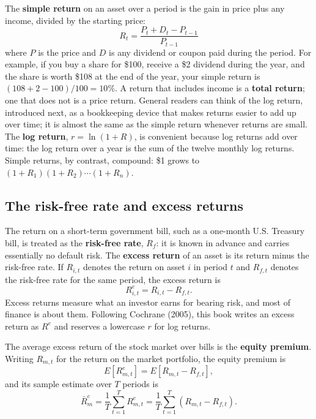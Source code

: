 The \textbf{simple return} on an asset over a period is the gain in price plus any income, divided by the starting price:
\begin{equation}
  R_t = \frac{P_t + D_t - P_{t-1}}{P_{t-1}}
  \label{eq:01-return}
\end{equation}
where $P$ is the price and $D$ is any dividend or coupon paid during the period. For example, if you buy a share for \$100, receive a \$2 dividend during the year, and the share is worth \$108 at the end of the year, your simple return is $(108 + 2 - 100)/100 = 10$\%. A return that includes income is a \textbf{total return}; one that does not is a price return. General readers can think of the log return, introduced next, as a bookkeeping device that makes returns easier to add up over time; it is almost the same as the simple return whenever returns are small. The \textbf{log return}, $r = \ln(1 + R)$, is convenient because log returns add over time: the log return over a year is the sum of the twelve monthly log returns. Simple returns, by contrast, compound: \$1 grows to $(1 + R_1)(1 + R_2)\cdots(1 + R_n)$.

\subsection{The risk-free rate and excess returns}
\label{sec:01-rf}

The return on a short-term government bill, such as a one-month U.S. Treasury bill, is treated as the \textbf{risk-free rate}, $R_f$: it is known in advance and carries essentially no default risk. 
The \textbf{excess return} of an asset is its return minus the risk-free rate. If $R_{i,t}$ denotes the return on asset $i$ in period $t$ and $R_{f,t}$ denotes the risk-free rate for the same period, the excess return is
\begin{equation}
R^{e}_{i,t} = R_{i,t} - R_{f,t}.
\label{eq:excess-return}
\end{equation}
Excess returns measure what an investor earns for bearing risk, and most of finance is about them. Following Cochrane (2005), this book writes an excess return as $R^{e}$ and reserves a lowercase $r$ for log returns.

The average excess return of the stock market over bills is the \textbf{equity premium}. Writing $R_{m,t}$ for the return on the market portfolio, the equity premium is
\begin{equation}
E\left[R^{e}_{m,t}\right] = E\left[R_{m,t} - R_{f,t}\right],
\label{eq:equity-premium}
\end{equation}
and its sample estimate over $T$ periods is
\begin{equation}
\bar{R}^{e}_{m} = \frac{1}{T}\sum_{t=1}^{T} R^{e}_{m,t} = \frac{1}{T}\sum_{t=1}^{T}\left(R_{m,t} - R_{f,t}\right).
\label{eq:equity-premium-sample}
\end{equation}




